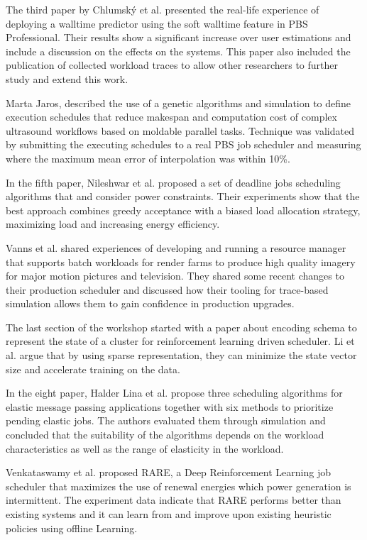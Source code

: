 \documentclass{llncs}
\begin{document}
The third paper by Chlumsk\'y et al. presented the real-life experience of deploying a walltime
predictor using the soft walltime feature in PBS Professional. Their results show a significant
increase over user estimations and include a discussion on the effects on the systems. This paper 
also included the publication of collected workload traces to allow other researchers to further
study and extend this work.

Marta Jaros, described the use of a genetic algorithms and simulation to define execution schedules that
reduce makespan and computation cost of complex ultrasound workflows based on moldable parallel tasks. 
Technique was validated by submitting the executing schedules to a real PBS job scheduler and measuring
where the maximum mean error of interpolation was within 10\%. 

In the fifth paper, Nileshwar et al. proposed a set of deadline jobs scheduling algorithms
that and consider power constraints. Their experiments show that the best approach combines
greedy acceptance with a biased load allocation strategy, maximizing load and increasing
energy efficiency.

Vanns et al. shared experiences of developing and running a resource manager that supports
batch workloads for render farms to produce high quality imagery for major motion pictures
and television. They shared some recent changes to their production scheduler and discussed
how their tooling for trace-based simulation allows them to gain confidence in production
upgrades.

The last section of the workshop started with a paper about encoding schema to represent
the state of a cluster for reinforcement learning driven scheduler. Li et al. argue that
by using sparse representation, they can minimize the state vector size and accelerate
training on the data.

In the eight paper, Halder Lina et al. propose three scheduling algorithms for elastic 
message passing applications together with six methods to prioritize pending elastic jobs.
The authors evaluated them through simulation and concluded that the suitability of the
algorithms depends on the workload characteristics as well as the range of elasticity
in the workload.

Venkataswamy et al. proposed RARE, a Deep Reinforcement Learning job scheduler that 
maximizes the use of renewal energies which power generation is intermittent. The experiment
data indicate that RARE performs better than existing systems and it can learn from and improve
upon existing heuristic policies using offline Learning.
\end{document}
